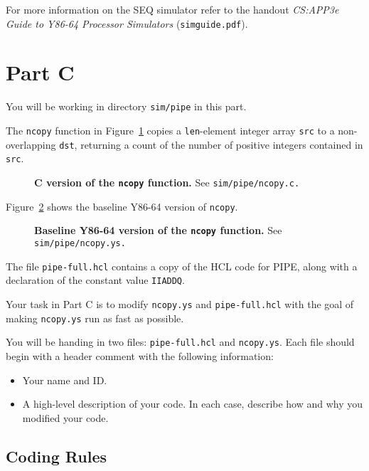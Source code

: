 \documentclass[11pt]{article}
\newcommand{\mycaption}[2]{\caption[#1]{\small \textsf{\textbf{#1} #2}}}
\newenvironment{ccode}%
{\small}%
{}
\begin{document}
For more information on the SEQ simulator refer to the handout
\textit{CS:APP3e Guide to Y86-64 Processor Simulators} (\texttt{simguide.pdf}).

\section{Part C}

You will be working in directory \texttt{sim/pipe} in this part.

The \texttt{ncopy} function in Figure~\ref{fig:ncopyc} copies a
\texttt{len}-element integer array \texttt{src} to a non-overlapping
\texttt{dst}, returning a count of the number of positive integers
contained in \texttt{src}.
\begin{figure}
\begin{ccode}

\end{ccode}
\mycaption{C version of the \texttt{ncopy} function.}{See \texttt{sim/pipe/ncopy.c.}}
\label{fig:ncopyc}
\end{figure}
Figure~\ref{fig:ncopys} shows the baseline Y86-64 version of \texttt{ncopy}. 
\begin{figure}
\begin{ccode}

\end{ccode}
\mycaption{Baseline Y86-64 version of the \texttt{ncopy} function.}{See \texttt{sim/pipe/ncopy.ys.}}
\label{fig:ncopys}
\end{figure}
The file \texttt{pipe-full.hcl} contains a copy of the HCL
code for PIPE, along with a declaration of the constant value \texttt{IIADDQ}.

Your task in Part C is to modify \texttt{ncopy.ys} and
\texttt{pipe-full.hcl} with the goal of making \texttt{ncopy.ys} run
as fast as possible.

You will be handing in two files: \texttt{pipe-full.hcl} and 
\texttt{ncopy.ys}. Each file should begin with a header comment
with the following information:
\begin{itemize}
\item Your name and ID.
\item A high-level description of your code. In each case, describe
how and why you modified your code.
\end{itemize}

\subsection*{Coding Rules}
\end{document}
